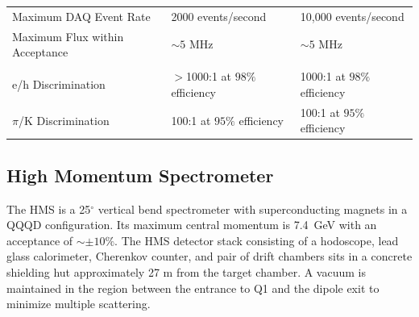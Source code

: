 \begin{table}[h]
{\begin{tabular}[t]{lll}
            Maximum DAQ Event Rate               & 2000 events/second             & 10,000 events/second        \\
            Maximum Flux within Acceptance       & $\sim 5$ MHz                   & $\sim 5$ MHz                \\
                                                                                                                \\
            e/h Discrimination                   & $>$1000:1 at $98\%$ efficiency & 1000:1 at $98\%$ efficiency \\
            $\pi$/K Discrimination               & 100:1 at $95\%$ efficiency     & 100:1 at $95\%$ efficiency  \\
            \hline
        \end{tabular}
    } %
\end{table}

\subsection{High Momentum Spectrometer}
The HMS is a 25$^{\circ}$ vertical bend spectrometer with superconducting
magnets in a QQQD configuration.
Its maximum central momentum is \SI{7.4}{\giga\electronvolt} with an acceptance of $\sim\pm10\%$.
The HMS detector stack consisting of a hodoscope, lead glass calorimeter,
Cherenkov counter, and pair of drift chambers sits in a concrete shielding
hut approximately 27 m from the target chamber.
A vacuum is maintained in the region between the entrance to Q1 and
the dipole exit to minimize multiple scattering.

